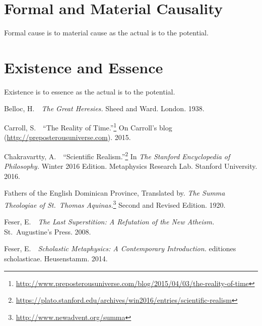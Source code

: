 \documentclass[twocolumn]{article}
\begin{document}
\section{Formal and Material Causality}

Formal cause is to material cause as the actual is to the potential.

\section{Existence and Essence}

Existence is to essence as the actual is to the potential.

\newpage



\begin{thebibliography}{}

   \begin{small}

      Belloc, H.\ \ {\it The Great Heresies.}  Sheed and Ward.  London.  1938.

      Carroll, S.\ \ ``The Reality of Time.''\footnote{%
         \url{http://www.preposterousuniverse.com/blog/2015/04/03/the-reality-of-time}%
      }
      On Carroll's blog (\url{http://preposterousuniverse.com}).  2015.

      Chakravartty, A.\ \ ``Scientific Realism.''\footnote{%
         \url{https://plato.stanford.edu/archives/win2016/entries/scientific-realism}%
      }
      In {\it The Stanford Encyclopedia of Philosophy.}  Winter 2016 Edition.
      Metaphysics Research Lab.  Stanford University.  2016.

      Fathers of the English Dominican Province, Translated by. {\it The
      Summa Theologiae of St.~Thomas Aquinas.}\footnote{%
         \url{http://www.newadvent.org/summa}%
      }
      Second and Revised Edition.  1920.

      Feser, E.\ \ {\it The Last Superstition: A Refutation of the New
      Atheism.}  St.~Augustine's Press.  2008.

      Feser, E.\ \ {\it Scholastic Metaphysics: A Contemporary Introduction.}
      editiones scholasticae.  Heusenstamm.  2014.


\end{small}
\end{thebibliography}
\end{document}
